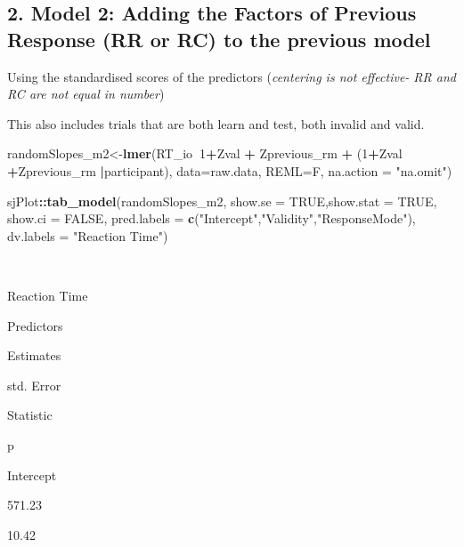 \documentclass[
]{article}
\newenvironment{Shaded}{\begin{snugshade}}{\end{snugshade}}
\newcommand{\DataTypeTok}[1]{\textcolor[rgb]{0.13,0.29,0.53}{#1}}
\newcommand{\DecValTok}[1]{\textcolor[rgb]{0.00,0.00,0.81}{#1}}
\newcommand{\KeywordTok}[1]{\textcolor[rgb]{0.13,0.29,0.53}{\textbf{#1}}}
\newcommand{\NormalTok}[1]{#1}
\newcommand{\OperatorTok}[1]{\textcolor[rgb]{0.81,0.36,0.00}{\textbf{#1}}}
\newcommand{\OtherTok}[1]{\textcolor[rgb]{0.56,0.35,0.01}{#1}}
\newcommand{\StringTok}[1]{\textcolor[rgb]{0.31,0.60,0.02}{#1}}
\begin{document}
\hypertarget{model-2-adding-the-factors-of-previous-response-rr-or-rc-to-the-previous-model}{%
\subsection{2. Model 2: Adding the Factors of Previous Response (RR or
RC) to the previous
model}\label{model-2-adding-the-factors-of-previous-response-rr-or-rc-to-the-previous-model}}

Using the standardised scores of the predictors (\emph{centering is not
effective- RR and RC are not equal in number})

This also includes trials that are both learn and test, both invalid and
valid.

\begin{Shaded}
\begin{Highlighting}[]
\NormalTok{randomSlopes_m2<-}\KeywordTok{lmer}\NormalTok{(RT_io}\OperatorTok{~}\DecValTok{1}\OperatorTok{+}\NormalTok{Zval }\OperatorTok{+}\StringTok{ }\NormalTok{Zprevious_rm }\OperatorTok{+}\StringTok{ }\NormalTok{(}\DecValTok{1}\OperatorTok{+}\NormalTok{Zval }\OperatorTok{+}\NormalTok{Zprevious_rm }\OperatorTok{|}\NormalTok{participant), }
                      \DataTypeTok{data=}\NormalTok{raw.data, }
                      \DataTypeTok{REML=}\NormalTok{F,}
                      \DataTypeTok{na.action =} \StringTok{"na.omit"}\NormalTok{)}

\NormalTok{sjPlot}\OperatorTok{::}\KeywordTok{tab_model}\NormalTok{(randomSlopes_m2, }\DataTypeTok{show.se =} \OtherTok{TRUE}\NormalTok{,}\DataTypeTok{show.stat =} \OtherTok{TRUE}\NormalTok{, }\DataTypeTok{show.ci =} \OtherTok{FALSE}\NormalTok{, }
                  \DataTypeTok{pred.labels =} \KeywordTok{c}\NormalTok{(}\StringTok{"Intercept"}\NormalTok{,}\StringTok{"Validity"}\NormalTok{,}\StringTok{"ResponseMode"}\NormalTok{),}
                  \DataTypeTok{dv.labels =} \StringTok{"Reaction Time"}\NormalTok{)}
\end{Highlighting}
\end{Shaded}

~

Reaction Time

Predictors

Estimates

std. Error

Statistic

p

Intercept

571.23

10.42
\end{document}
